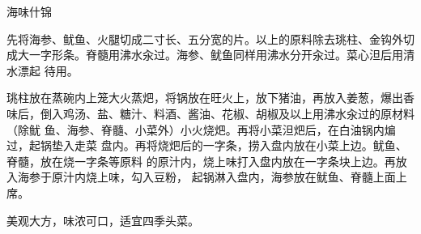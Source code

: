%
%
%
%
%
%
%
\begin{recipe}{海味什锦}

\ingredients


\preparation

\step 先将海参、鱿鱼、火腿切成二寸长、五分宽的片。以上的原料除去珧柱、金钩外切
成大一字形条。脊髓用沸水汆过。海参、鱿鱼同样用沸水分开汆过。菜心泹后用清水漂起
待用。

\step 珧柱放在蒸碗内上笼大火蒸𤆵，将锅放在旺火上，放下猪油，再放入姜葱，爆出香
味后，倒入鸡汤、盐、糖汁、料酒、酱油、花椒、胡椒及以上用沸水汆过的原材料（除鱿
鱼、海参、脊髓、小菜外）小火烧𤆵。再将小菜泹𤆵后，在白油锅内煸过，起锅垫入走菜
盘内。再将烧𤆵后的一字条，捞入盘内放在小菜上边。鱿鱼、脊髓，放在烧一字条等原料
的原汁内，烧上味打入盘内放在一字条块上边。再放入海参于原汁内烧上味，勾入豆粉，
起锅淋入盘内，海参放在鱿鱼、脊髓上面上席。

\features

美观大方，味浓可口，适宜四季头菜。

\end{recipe}

